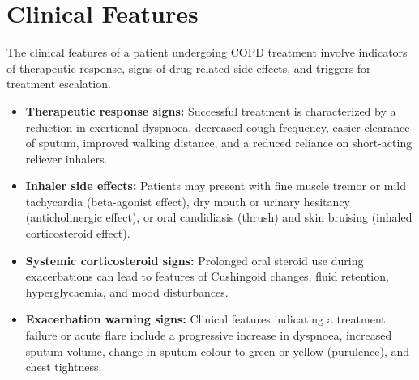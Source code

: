 \section*{Clinical Features}
The clinical features of a patient undergoing COPD treatment involve indicators of therapeutic response, signs of drug-related side effects, and triggers for treatment escalation.
\begin{itemize}
    \item \textbf{Therapeutic response signs:} Successful treatment is characterized by a reduction in exertional dyspnoea, decreased cough frequency, easier clearance of sputum, improved walking distance, and a reduced reliance on short-acting reliever inhalers.
    \item \textbf{Inhaler side effects:} Patients may present with fine muscle tremor or mild tachycardia (beta-agonist effect), dry mouth or urinary hesitancy (anticholinergic effect), or oral candidiasis (thrush) and skin bruising (inhaled corticosteroid effect).
    \item \textbf{Systemic corticosteroid signs:} Prolonged oral steroid use during exacerbations can lead to features of Cushingoid changes, fluid retention, hyperglycaemia, and mood disturbances.
    \item \textbf{Exacerbation warning signs:} Clinical features indicating a treatment failure or acute flare include a progressive increase in dyspnoea, increased sputum volume, change in sputum colour to green or yellow (purulence), and chest tightness.
\end{itemize}

